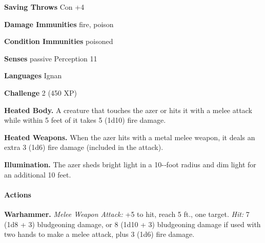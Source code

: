 \documentclass[
]{article}
\begin{document}
\textbf{Saving Throws} Con +4

\textbf{Damage Immunities} fire, poison

\textbf{Condition Immunities} poisoned

\textbf{Senses} passive Perception 11

\textbf{Languages} Ignan

\textbf{Challenge} 2 (450 XP)

\textbf{Heated Body.} A creature that touches the azer or hits it with a
melee attack while within 5 feet of it takes 5 (1d10) fire damage.

\textbf{Heated Weapons.} When the azer hits with a metal melee weapon,
it deals an extra 3 (1d6) fire damage (included in the attack).

\textbf{Illumination.} The azer sheds bright light in a 10-­‐foot radius
and dim light for an additional 10 feet.

\hypertarget{actions-8}{%
\paragraph{Actions}\label{actions-8}}

\textbf{Warhammer.} \emph{Melee Weapon Attack:} +5 to hit, reach 5 ft.,
one target. \emph{Hit:} 7 (1d8 + 3) bludgeoning damage, or 8 (1d10 + 3)
bludgeoning damage if used with two hands to make a melee attack, plus 3
(1d6) fire damage.
\end{document}
